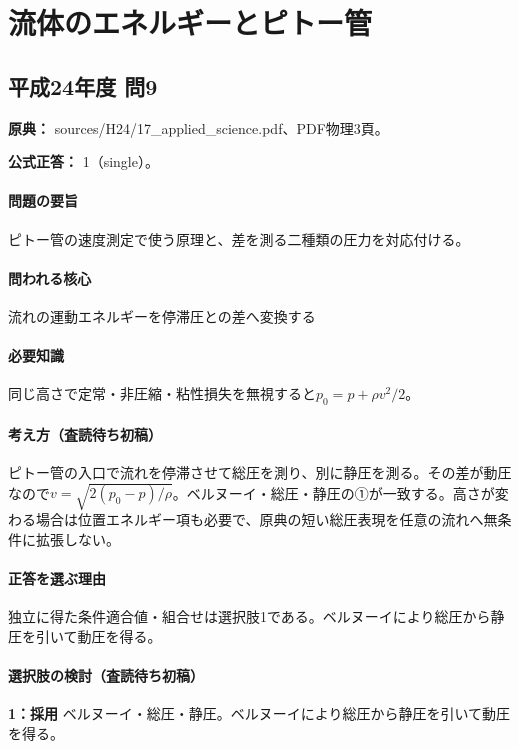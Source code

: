 \section{流体のエネルギーとピトー管}

\subsection{平成24年度 問9}
\label{q:h24-reg-applied-09}

\noindent\textbf{原典：} sources/H24/17\_applied\_science.pdf、PDF物理3頁。

\textbf{公式正答：} 1（single）。

\paragraph{問題の要旨} ピトー管の速度測定で使う原理と、差を測る二種類の圧力を対応付ける。

\paragraph{問われる核心} 流れの運動エネルギーを停滞圧との差へ変換する

\paragraph{必要知識} 同じ高さで定常・非圧縮・粘性損失を無視すると\(p_0=p+\rho v^2/2\)。

\paragraph{考え方（査読待ち初稿）} ピトー管の入口で流れを停滞させて総圧を測り、別に静圧を測る。その差が動圧なので\(v=\sqrt{2(p_0-p)/\rho}\)。ベルヌーイ・総圧・静圧の①が一致する。高さが変わる場合は位置エネルギー項も必要で、原典の短い総圧表現を任意の流れへ無条件に拡張しない。

\paragraph{正答を選ぶ理由} 独立に得た条件適合値・組合せは選択肢1である。ベルヌーイにより総圧から静圧を引いて動圧を得る。

\paragraph{選択肢の検討（査読待ち初稿）}

\noindent\textbf{1：採用} ベルヌーイ・総圧・静圧。ベルヌーイにより総圧から静圧を引いて動圧を得る。\par

